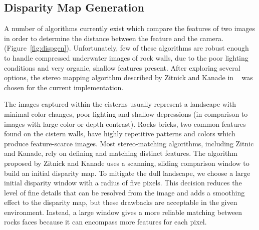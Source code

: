 \documentclass[a4paper,twoside]{article}
\begin{document}
\subsection{Disparity Map Generation}
\label{disparityMapGeneration}

\begin{figure*}[!ht]
   \vspace{-0.2cm}
   \caption{How we generate disparity maps from images.}
  \label{fig:dispgen}
 \end{figure*}


A number of algorithms currently exist which compare the features of two images in order to determine the distance between the feature and the camera. (Figure~\ref{fig:dispgen}). 
Unfortunately, few of these algorithms are robust enough to handle compressed underwater images of rock walls, due to the poor lighting conditions and very organic, shallow features present.
After exploring several options, the stereo mapping algorithm described by Zitnick and Kanade in ~\cite{stereo:zitKan} was chosen for the current implementation.

The images captured within the cisterns usually represent a landscape with minimal color changes, poor lighting and shallow depressions (in comparison to images with large color or depth contrast).
Rocks bricks, two common features found on the cistern walls, have highly repetitive patterns and colors which produce feature-scarce images.
Most stereo-matching algorithms, including Zitnic and Kanade, rely on defining and matching distinct features.
The algorithm proposed by Zitnick and Kanade uses a scanning, sliding comparison window to build an initial disparity map.
To mitigate the dull landscape, we choose a large initial disparity window with a radius of five pixels.
This decision reduces the level of fine details that can be resolved from the image and adds a smoothing effect to the disparity map, but these drawbacks are acceptable in the given environment.
Instead, a large window gives a more reliable matching between rocks faces because it can encompass more features for each pixel.  
\end{document}
